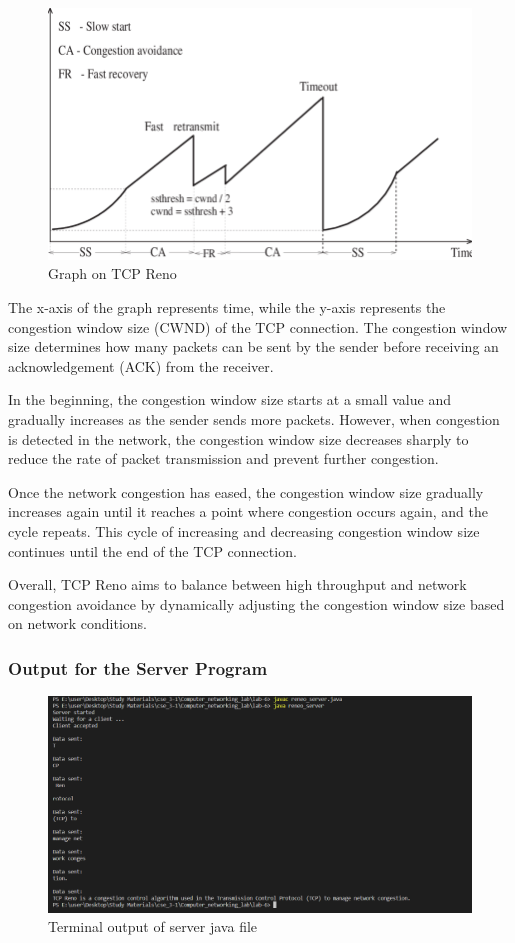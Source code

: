 \documentclass[11pt]{article}
\begin{document}
 \begin{figure}[!h]
\centering
\includegraphics[width=\textwidth]{reno_general.png}
\caption{Graph on TCP Reno}
\end{figure}
\FloatBarrier

The x-axis of the graph represents time, while the y-axis represents the congestion window size (CWND) of the TCP connection. The congestion window size determines how many packets can be sent by the sender before receiving an acknowledgement (ACK) from the receiver.

In the beginning, the congestion window size starts at a small value and gradually increases as the sender sends more packets. However, when congestion is detected in the network, the congestion window size decreases sharply to reduce the rate of packet transmission and prevent further congestion.

Once the network congestion has eased, the congestion window size gradually increases again until it reaches a point where congestion occurs again, and the cycle repeats. This cycle of increasing and decreasing congestion window size continues until the end of the TCP connection.

Overall, TCP Reno aims to balance between high throughput and network congestion avoidance by dynamically adjusting the congestion window size based on network conditions.

\subsubsection{Output for the Server Program}

 \begin{figure}[!h]
\centering
\includegraphics[width=\textwidth]{ren_server.png}
\caption{Terminal output of server java file }
\end{figure}
\FloatBarrier
\end{document}
